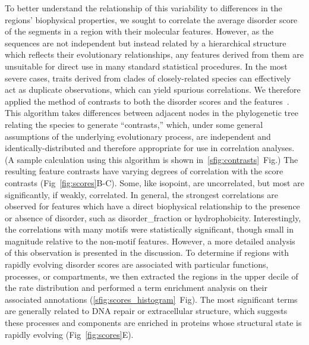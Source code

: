 To better understand the relationship of this variability to differences in the regions' biophysical properties, we sought to correlate the average disorder score of the segments in a region with their molecular features. However, as the sequences are not independent but instead related by a hierarchical structure which reflects their evolutionary relationships, any features derived from them are unsuitable for direct use in many standard statistical procedures. In the most severe cases, traits derived from clades of closely-related species can effectively act as duplicate observations, which can yield spurious correlations. We therefore applied the method of contrasts to both the disorder scores and the features~\cite{Felsenstein1973, Felsenstein1985}. This algorithm takes differences between adjacent nodes in the phylogenetic tree relating the species to generate ``contrasts,'' which, under some general assumptions of the underlying evolutionary process, are independent and identically-distributed and therefore appropriate for use in correlation analyses. (A sample calculation using this algorithm is shown in~\ref{sfig:contrasts}~Fig.) The resulting feature contrasts have varying degrees of correlation with the score contrasts (Fig~\ref{fig:scores}B-C). Some, like isopoint, are uncorrelated, but most are significantly, if weakly, correlated. In general, the strongest correlations are observed for features which have a direct biophysical relationship to the presence or absence of disorder, such as disorder\_fraction or hydrophobicity. Interestingly, the correlations with many motifs were statistically significant, though small in magnitude relative to the non-motif features. However, a more detailed analysis of this observation is presented in the discussion. To determine if regions with rapidly evolving disorder scores are associated with particular functions, processes, or compartments, we then extracted the regions in the upper decile of the rate distribution and performed a term enrichment analysis on their associated annotations (\ref{sfig:scores_histogram}~Fig). The most significant terms are generally related to DNA repair or extracellular structure, which suggests these processes and components are enriched in proteins whose structural state is rapidly evolving (Fig~\ref{fig:scores}E).

